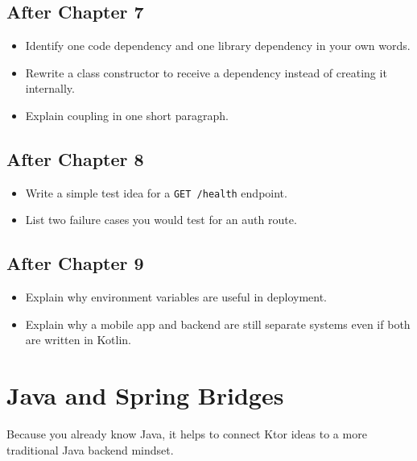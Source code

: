 \documentclass[11pt,a4paper]{article}
\begin{document}
\subsection{After Chapter 7}

\begin{itemize}
    \item Identify one code dependency and one library dependency in your own words.
    \item Rewrite a class constructor to receive a dependency instead of creating it internally.
    \item Explain coupling in one short paragraph.
\end{itemize}

\subsection{After Chapter 8}

\begin{itemize}
    \item Write a simple test idea for a \texttt{GET /health} endpoint.
    \item List two failure cases you would test for an auth route.
\end{itemize}

\subsection{After Chapter 9}

\begin{itemize}
    \item Explain why environment variables are useful in deployment.
    \item Explain why a mobile app and backend are still separate systems even if both are written in Kotlin.
\end{itemize}

\section{Java and Spring Bridges}

Because you already know Java, it helps to connect Ktor ideas to a more traditional Java backend mindset.
\end{document}
